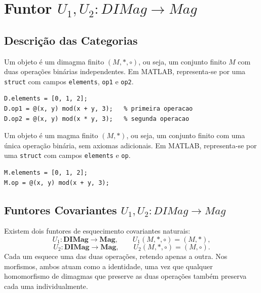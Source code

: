 \section{Funtor \texorpdfstring{$U_1, U_2: DIMag \to Mag$}{U1, U2: DIMag -> Mag}}
\label{sec:functor-dimag-mag}

\subsection{Descrição das Categorias}

\begin{definition}
Um objeto é um dimagma finito $(M, \ast, \circ)$, ou seja, um conjunto finito $M$ com duas operações binárias independentes. Em MATLAB, representa-se por uma \texttt{struct} com campos \texttt{elements}, \texttt{op1} e \texttt{op2}.
\end{definition}

\begin{lstlisting}[style=matlab, caption={Objeto em $\mathbf{DIMag}$}]
D.elements = [0, 1, 2];
D.op1 = @(x, y) mod(x + y, 3);   % primeira operacao
D.op2 = @(x, y) mod(x * y, 3);   % segunda operacao
\end{lstlisting}

\begin{definition}
Um objeto é um magma finito $(M, \ast)$, ou seja, um conjunto finito com uma única operação binária, sem axiomas adicionais. Em MATLAB, representa-se por uma \texttt{struct} com campos \texttt{elements} e \texttt{op}.
\end{definition}

\begin{lstlisting}[style=matlab, caption={Objeto em $\mathbf{Mag}$}]
M.elements = [0, 1, 2];
M.op = @(x, y) mod(x + y, 3);
\end{lstlisting}

\subsection{Funtores Covariantes \texorpdfstring{$U_1, U_2: DIMag \to Mag$}{U1, U2: DIMag -> Mag}}

Existem dois funtores de esquecimento covariantes naturais:
\[
    U_1: \mathbf{DIMag} \to \mathbf{Mag}, \qquad U_1(M, \ast, \circ) = (M, \ast),
\]
\[
    U_2: \mathbf{DIMag} \to \mathbf{Mag}, \qquad U_2(M, \ast, \circ) = (M, \circ).
\]
Cada um esquece uma das duas operações, retendo apenas a outra. Nos morfismos, ambos atuam como a identidade, uma vez que qualquer homomorfismo de dimagmas que preserve as duas operações também preserva cada uma individualmente.

